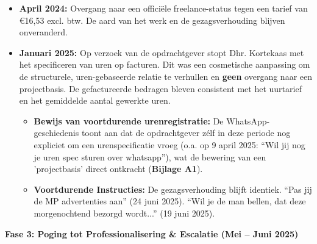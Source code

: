 \documentclass[10pt,a4paper]{article}
\begin{document}
\begin{adjustwidth}{15mm}{15mm}
\begin{itemize}
\item \textbf{April 2024:} Overgang naar een officiële freelance-status tegen een tarief van €16,53 excl. btw. De aard van het werk en de gezagsverhouding blijven onveranderd.
\item \textbf{Januari 2025:} Op verzoek van de opdrachtgever stopt Dhr. Kortekaas met het specificeren van uren op facturen. Dit was een cosmetische aanpassing om de structurele, uren-gebaseerde relatie te verhullen en \textbf{geen} overgang naar een projectbasis. De gefactureerde bedragen bleven consistent met het uurtarief en het gemiddelde aantal gewerkte uren.
    \begin{itemize}
    \item \textbf{Bewijs van voortdurende urenregistratie:} De WhatsApp-geschiedenis toont aan dat de opdrachtgever zélf in deze periode nog expliciet om een urenspecificatie vroeg (o.a. op 9 april 2025: ``Wil jij nog je uren spec sturen over whatsapp''), wat de bewering van een 'projectbasis' direct ontkracht (\textbf{Bijlage A1}).
    \item \textbf{Voortdurende Instructies:} De gezagsverhouding blijft identiek. ``Pas jij de MP advertenties aan'' (24 juni 2025). ``Wil je de man bellen, dat deze morgenochtend bezorgd wordt...'' (19 juni 2025).
    \end{itemize}
\end{itemize}

{\fontsize{10}{15}\selectfont\textbf{Fase 3: Poging tot Professionalisering \& Escalatie (Mei – Juni 2025)}}


\end{adjustwidth}
\end{document}
